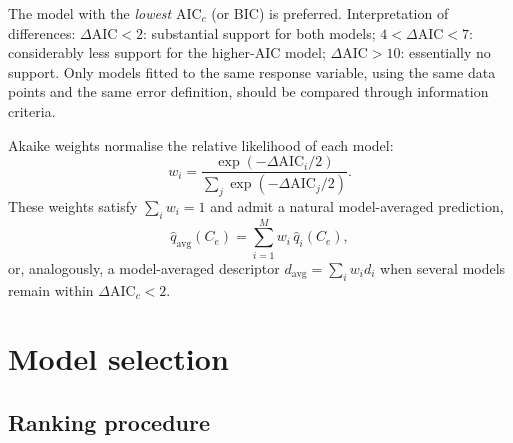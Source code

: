 \documentclass[journal=jacsat,manuscript=article]{achemso}
\begin{document}
The model with the \emph{lowest} AIC$_c$ (or BIC) is preferred.
Interpretation of differences:
$\Delta\mathrm{AIC} < 2$: substantial support for both models;
$4 < \Delta\mathrm{AIC} < 7$: considerably less support for the
higher-AIC model;
$\Delta\mathrm{AIC} > 10$: essentially no support.
Only models fitted to the same response variable, using the same data
points and the same error definition, should be compared through
information criteria.

Akaike weights normalise the relative likelihood of each model:
\begin{equation}
	w_i = \frac{\exp(-\Delta\mathrm{AIC}_i/2)}
	{\sum_{j}\exp(-\Delta\mathrm{AIC}_j/2)}.
	\label{eq:si_Akaike_weight}
\end{equation}
These weights satisfy $\sum_i w_i = 1$ and admit a natural
model-averaged prediction,
\begin{equation}
	\hat{q}_{\mathrm{avg}}(C_e)
	=
	\sum_{i=1}^{M} w_i\, \hat{q}_i(C_e),
	\label{eq:si_model_average}
\end{equation}
or, analogously, a model-averaged descriptor
$d_{\mathrm{avg}} = \sum_i w_i d_i$ when several models remain within
$\Delta\mathrm{AIC}_c < 2$.


\section{Model selection}
\label{sec:si_model_selection}

\subsection{Ranking procedure}
\label{sec:si_ranking}
\end{document}
